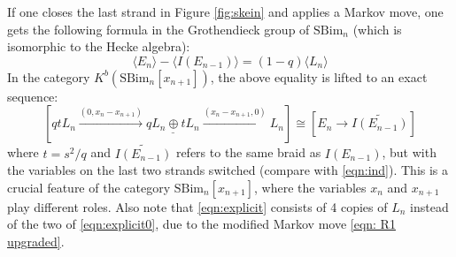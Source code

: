 \documentclass[12pt]{amsart}
\numberwithin{equation}{section}
\newtheorem{theorem}{Theorem}[section]
\theoremstyle{definition}
\theoremstyle{remark}
\newcommand{\CE}{\mathcal{E}}
\newcommand{\CL}{\mathcal{L}}
\renewcommand{\1}{\mathbf{1}}
\newcommand{\FH}{\mathrm{FHilb}}
\newcommand{\SBim}{\mathrm{SBim}}
\begin{document}
If one closes the last strand in Figure \ref{fig:skein} and applies a Markov move, one gets the following formula in the Grothendieck group of $\SBim_n$ (which is isomorphic to the Hecke algebra):
\begin{equation}
\label{eqn:explicit0}
\langle E_n\rangle - \langle I(E_{n-1})\rangle = (1-q)\langle L_{n} \rangle
\end{equation}
In the category $K^b(\SBim_n[x_{n+1}])$, the above equality is lifted to an exact sequence:
\begin{equation}
\label{eqn:explicit}
\left[ qt L_{n}\xrightarrow{(0,x_n-x_{n+1})} \underline{q L_{n}\oplus t L_{n}} \xrightarrow{(x_n-x_{n+1},0)}L_{n} \right] \cong \left[ E_n \longrightarrow \widetilde{I(E_{n-1})} \right]
\end{equation}
where $t = s^2/q$ and $\widetilde{I(E_{n-1})}$ refers to the same braid as $I(E_{n-1})$, but with the variables on the last two strands switched (compare with \eqref{eqn:ind}). This is a crucial feature of the category $\SBim_n[x_{n+1}]$, where the variables $x_n$ and $x_{n+1}$ play different roles. Also note that \eqref{eqn:explicit} consists of 4 copies of $L_n$ instead of the two of \eqref{eqn:explicit0}, due to the modified Markov move \eqref{eqn: R1 upgraded}. 



\end{document}

